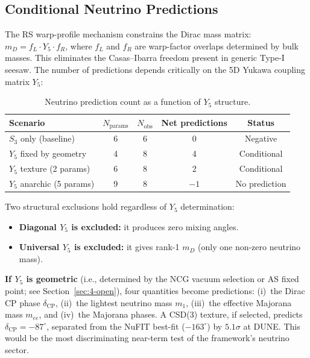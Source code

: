 \subsection{Conditional Neutrino Predictions}
\label{sec:4-conditional-nu}

The RS warp-profile mechanism constrains the Dirac mass matrix: $m_D = f_L \cdot Y_5 \cdot f_R$, where $f_L$ and $f_R$ are warp-factor overlaps determined by bulk masses.  This eliminates the Casas--Ibarra freedom present in generic Type-I seesaw.  The number of predictions depends critically on the 5D Yukawa coupling matrix $Y_5$:

\begin{table}[htbp]
\centering
\caption{Neutrino prediction count as a function of $Y_5$ structure.}
\label{tab:4-nu-predictions}
\small
\begin{tabular}{@{}lcccc@{}}
\toprule
Scenario & $N_{\mathrm{params}}$ & $N_{\mathrm{obs}}$ & Net predictions & Status \\
\midrule
$S_3$ only (baseline) & 6 & 6 & 0 & Negative \\
$Y_5$ fixed by geometry & 4 & 8 & 4 & Conditional \\
$Y_5$ texture (2 params) & 6 & 8 & 2 & Conditional \\
$Y_5$ anarchic (5 params) & 9 & 8 & $-1$ & No prediction \\
\bottomrule
\end{tabular}
\end{table}

Two structural exclusions hold regardless of $Y_5$ determination:
\begin{itemize}
  \item \textbf{Diagonal $Y_5$ is excluded:} it produces zero mixing angles.
  \item \textbf{Universal $Y_5$ is excluded:} it gives rank-1 $m_D$ (only one non-zero neutrino mass).
\end{itemize}

\textbf{If $Y_5$ is geometric} (i.e., determined by the NCG vacuum selection or AS fixed point; see Section~\ref{sec:4-open}), four quantities become predictions: (i)~the Dirac CP phase $\delta_{\mathrm{CP}}$, (ii)~the lightest neutrino mass $m_1$, (iii)~the effective Majorana mass $m_{ee}$, and (iv)~the Majorana phases.  A CSD(3) texture, if selected, predicts $\delta_{\mathrm{CP}} = -87^\circ$, separated from the NuFIT best-fit ($-163^\circ$) by $5.1\sigma$ at DUNE.  This would be the most discriminating near-term test of the framework's neutrino sector.


